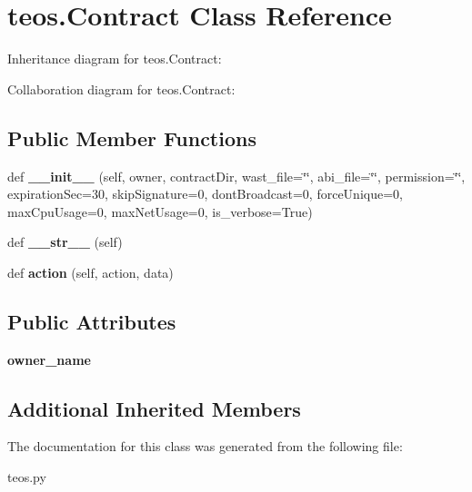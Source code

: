 \hypertarget{classteos_1_1Contract}{}\section{teos.\+Contract Class Reference}
\label{classteos_1_1Contract}


Inheritance diagram for teos.\+Contract\+:


Collaboration diagram for teos.\+Contract\+:
\subsection*{Public Member Functions}
\begin{DoxyCompactItemize}
\item 
\mbox{\label{classteos_1_1Contract_a61b54fcd9138b9ac7a0eba3001ff287a}} 
def {\bfseries \+\_\+\+\_\+init\+\_\+\+\_\+} (self, owner, contract\+Dir, wast\+\_\+file=\char`\"{}\char`\"{}, abi\+\_\+file=\char`\"{}\char`\"{}, permission=\char`\"{}\char`\"{}, expiration\+Sec=30, skip\+Signature=0, dont\+Broadcast=0, force\+Unique=0, max\+Cpu\+Usage=0, max\+Net\+Usage=0, is\+\_\+verbose=True)
\item 
\mbox{\label{classteos_1_1Contract_a4d9c87049049ae029cfbc8620f056661}} 
def {\bfseries \+\_\+\+\_\+str\+\_\+\+\_\+} (self)
\item 
\mbox{\label{classteos_1_1Contract_a5eb1be0430fe1ac9b245f12b6d27c4e5}} 
def {\bfseries action} (self, action, data)
\end{DoxyCompactItemize}
\subsection*{Public Attributes}
\begin{DoxyCompactItemize}
\item 
\mbox{\label{classteos_1_1Contract_aa77ff9c5e0842e6f7373dc3acbb0acb7}} 
{\bfseries owner\+\_\+name}
\end{DoxyCompactItemize}
\subsection*{Additional Inherited Members}


The documentation for this class was generated from the following file\+:\begin{DoxyCompactItemize}
\item 
teos.\+py\end{DoxyCompactItemize}
